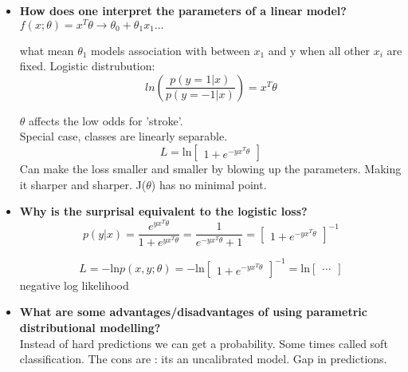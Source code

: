 \begin{itemize}
    \item \textbf{How does one interpret the parameters of a linear model? }\\
    $f(x;\theta) = x^{T}\theta \rightarrow \theta_0 + \theta_1x_1 \ldots$

    what mean $\theta_1$ models association with between $x_1$ and y when all other $x_i$ are fixed. 
    Logistic distrubution:
    \begin{equation}
    ln(\frac{p(y=1 |x)} {p(y=-1 |x)}) = x^{T}\theta 
    \end{equation}

    $\theta$ affects the low odds for 'stroke'. \\

    Special case, classes are linearly separable. 
    \begin{equation}
    L = \text{ln}\begin{bmatrix} 1 + e^{-yx^{T}\theta} \end{bmatrix}
    \end{equation}
	Can make the loss smaller and smaller by blowing up the parameters. Making it sharper and sharper. J($\theta$) has no minimal point.
    
    \item \textbf{Why is the surprisal equivalent to the logistic loss?} \\
    \begin{equation}
    p(y |x) = \frac{e^{yx^{T}\theta}} {1+ e^{yx^{T}\theta}} = \frac{1} {e^{-yx^{T}\theta} + 1} = \begin{bmatrix} 1 + e^{-yx^{T}\theta} \end{bmatrix}^{-1}  
    \end{equation}

    \begin{equation}
    L = - \text{ln}p(x,y;\theta) = - \text{ln}\begin{bmatrix} 1 + e^{-yx^{T}\theta} \end{bmatrix}^{-1} = \text{ln}\begin{bmatrix} \ldots \end{bmatrix}
    \end{equation}
    negative log likelihood 

    \item \textbf{What are some advantages/disadvantages of using parametric
    distributional modelling?} \\
    Instead of hard predictions we can get a probability. Some times called soft classification. The cons are : its an uncalibrated model. Gap in predictions.  



\end{itemize}
